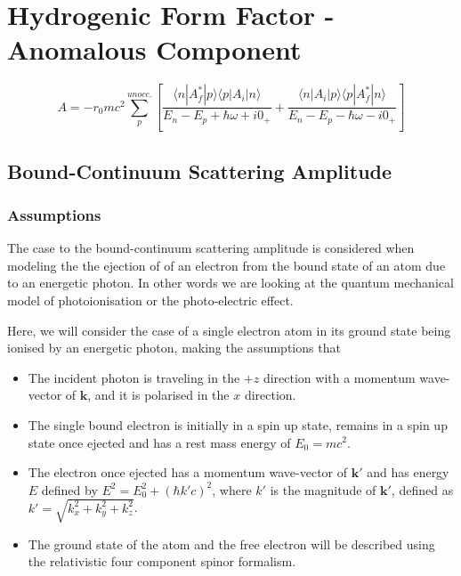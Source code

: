 \documentclass[a4paper,titlepage]{report}
\newcommand{\mb}[1]{\mathbf{#1}}
\newcommand{\ket}[1]{|#1 \rangle}
\newcommand{\bra}[1]{\langle #1|}
\begin{document}
\section{Hydrogenic Form Factor - Anomalous Component}
	\begin{equation}
		A = -r_0 mc^2 \sum_p^{unocc.} 
			\left[
				\frac{\bra{n} A_f^* \ket{p} \bra{p} A_i \ket{n} }
					 {E_n - E_p + \hbar \omega + i0_+}
				+
				\frac{\bra{n} A_i \ket{p} \bra{p} A_f^* \ket{n} }
					 {E_n - E_p - \hbar \omega - i0_+}
			\right]
	\end{equation}

	\subsection{Bound-Continuum Scattering Amplitude}

	\subsubsection{Assumptions}
	The case to the bound-continuum scattering amplitude is considered when
	modeling the the ejection of of an electron from the bound state of an atom
	due to an energetic photon. In other words we are looking at the quantum
	mechanical model of photoionisation or the photo-electric effect.

	Here, we will consider the case of a single electron atom in its ground
	state being ionised by an energetic photon, making the assumptions that
	\begin{itemize}
	\item The incident photon is traveling in the $+z$ direction with a
	momentum wave-vector of $\mb{k}$, and it is polarised in the $x$ direction.
	\item The single bound electron is initially in a spin up state, remains in
	a spin up state once ejected and has a rest mass energy of $E_0 = mc^2$.
	\item The electron once ejected has a momentum wave-vector of $\mb{k'}$ and
	has energy $E$ defined by $E^2 = E_0^2 + ( \hbar k' c)^2$, where $k'$ is the
	magnitude of $\mb{k'}$, defined as $k' = \sqrt{k_x^2 + k_y^2 + k_z^2}$.
	\item The ground state of the atom and the free electron will be described
	using the relativistic four component spinor formalism.
	\end{itemize}
\end{document}
